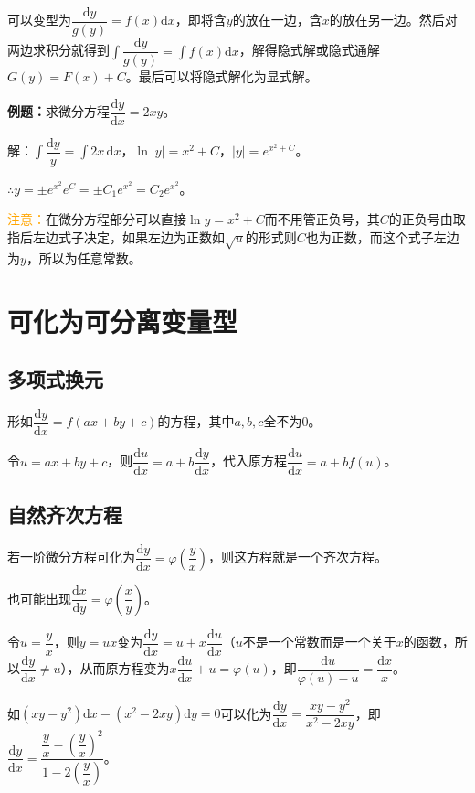 \documentclass[UTF8, 12pt]{ctexart}
\begin{document}
可以变型为$\dfrac{\textrm{d}y}{g(y)}=f(x)\textrm{d}x$，即将含$y$的放在一边，含$x$的放在另一边。然后对两边求积分就得到$\displaystyle{\int\dfrac{\textrm{d}y}{g(y)}=\int f(x)\textrm{d}x}$，解得隐式解或隐式通解$G(y)=F(x)+C$。最后可以将隐式解化为显式解。

\textbf{例题：}求微分方程$\dfrac{\textrm{d}y}{\textrm{d}x}=2xy$。

解：$\displaystyle{\int\dfrac{\textrm{d}y}{y}}=\int2x\,\textrm{d}x$，$\ln\vert y\vert=x^2+C$，$\vert y\vert=e^{x^2+C}$。

$\therefore y=\pm e^{x^2}e^C=\pm C_1e^{x^2}=C_2e^{x^2}$。

\textcolor{orange}{注意：}在微分方程部分可以直接$\ln y=x^2+C$而不用管正负号，其$C$的正负号由取指后左边式子决定，如果左边为正数如$\sqrt{u}$的形式则$C$也为正数，而这个式子左边为$y$，所以为任意常数。

\section{可化为可分离变量型}

\subsection{多项式换元}

形如$\dfrac{\textrm{d}y}{\textrm{d}x}=f(ax+by+c)$的方程，其中$a,b,c$全不为0。

令$u=ax+by+c$，则$\dfrac{\textrm{d}u}{\text{d}x}=a+b\dfrac{\textrm{d}y}{\textrm{d}x}$，代入原方程$\dfrac{\textrm{d}u}{\textrm{d}x}=a+bf(u)$。

\subsection{自然齐次方程}

若一阶微分方程可化为$\dfrac{\textrm{d}y}{\textrm{d}x}=\varphi\left(\dfrac{y}{x}\right)$，则这方程就是一个齐次方程。

也可能出现$\dfrac{\textrm{d}x}{\textrm{d}y}=\varphi\left(\dfrac{x}{y}\right)$。

令$u=\dfrac{y}{x}$，则$y=ux$变为$\dfrac{\textrm{d}y}{\textrm{d}x}=u+x\dfrac{\textrm{d}u}{\textrm{d}x}$（$u$不是一个常数而是一个关于$x$的函数，所以$\dfrac{\textrm{d}y}{\textrm{d}x}\neq u$），从而原方程变为$x\dfrac{\textrm{d}u}{\textrm{d}x}+u=\varphi(u)$，即$\dfrac{\textrm{d}u}{\varphi(u)-u}=\dfrac{\textrm{d}x}{x}$。

如$(xy-y^2)\textrm{d}x-(x^2-2xy)\textrm{d}y=0$可以化为$\dfrac{\textrm{d}y}{\textrm{d}x}=\dfrac{xy-y^2}{x^2-2xy}$，即$\dfrac{\textrm{d}y}{\textrm{d}x}=\dfrac{\dfrac{y}{x}-\left(\dfrac{y}{x}\right)^2}{1-2\left(\dfrac{y}{x}\right)}$。
\end{document}
